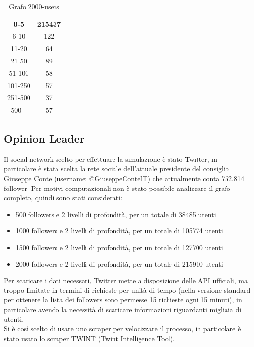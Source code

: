     \begin{table}[h!]
    \centering
    \begin{tabular}{ |c|c| }
     \hline
     0-5 & 215437 \\
     \hline
     6-10 & 122 \\
     \hline
     11-20 & 64 \\
     \hline
     21-50 & 89 \\
     \hline
     51-100 & 58 \\
     \hline
     101-250 & 57 \\
     \hline
     251-500 & 37 \\
     \hline
     500+ & 57 \\
     \hline
    \end{tabular}
    \caption{Grafo 2000-users}
    \end{table}

    \subsection{Opinion Leader}
    Il social network scelto per effettuare la simulazione è stato Twitter, in particolare è stata scelta la rete sociale dell’attuale presidente del consiglio Giuseppe Conte (username: @GiuseppeConteIT\cite{twitterGiuseppeConte}) che attualmente conta 752.814 follower. Per motivi computazionali non è stato possibile analizzare il grafo completo, quindi sono stati considerati:
    \begin{itemize}
        \item 500 followers e 2 livelli di profondità, per un totale di 38485 utenti
        \item 1000 followers e 2 livelli di profondità, per un totale di 105774 utenti
        \item 1500 followers e 2 livelli di profondità, per un totale di 127700 utenti
        \item 2000 followers e 2 livelli di profondità, per un totale di 215910 utenti
    \end{itemize}
   
    Per scaricare i dati necessari, Twitter mette a disposizione delle API ufficiali, ma troppo limitate in termini di richieste per unità di tempo (nella versione standard per ottenere la lista dei followers sono permesse 15 richieste ogni 15 minuti), in particolare avendo la necessità di scaricare informazioni riguardanti migliaia di utenti.\\
    Si è così scelto di usare uno scraper per velocizzare il processo, in particolare è stato usato lo scraper TWINT\cite{Twint} (Twint Intelligence Tool).
